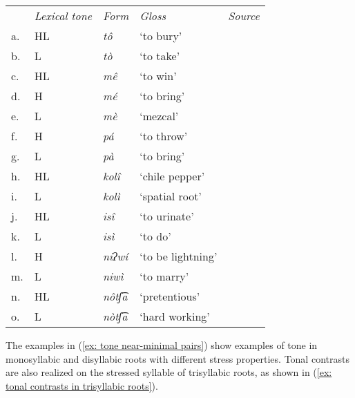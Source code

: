 \begin{tabularx}{.9\textwidth}{lQlll}
       & \textit{Lexical tone} & \textit{Form} & \textit{Gloss} & \textit{Source}\\
    a. & HL & \textit{tô}&‘to bury' & \\
    b. & L & \textit{tò} & ‘to take' &\\
    c. & HL & \textit{mê} & `to win' & \\
    d. & H & \textit{mé} & `to bring' & \\
    e. & L & \textit{mè} & ‘mezcal’ & \\
    f. & H & {\textit{pá}} & {‘to throw’}& \\
    g. & L & {\textit{pà}}&{‘to bring’}& \\
    h. & HL & {\textit{kolî}}&{‘chile pepper’}& \\
    i. & L & {\textit{kolì}}&{`spatial root’}& \\
    j. & HL & {\textit{isî}}&{‘to urinate’} &  \\
    k. & L & {\textit{isì}}&{‘to do’} & \\
    l. & H & {\textit{niʔwí}}& {‘to be lightning’}& \\
    m. & L & {\textit{niwì}}&{‘to marry’} & \\
    n. & HL & {\textit{nôtʃ͡a}}&{‘pretentious'} & \\
    o. & L & {\textit{nòtʃ͡a}}&{‘hard working'} & \\
\end{tabularx}

\z

The examples in (\ref{ex: tone near-minimal pairs}) show examples of tone in monosyllabic and disyllabic roots with different stress properties. Tonal contrasts are also realized on the stressed syllable of trisyllabic roots, as shown in (\ref{ex: tonal contrasts in trisyllabic roots}).

